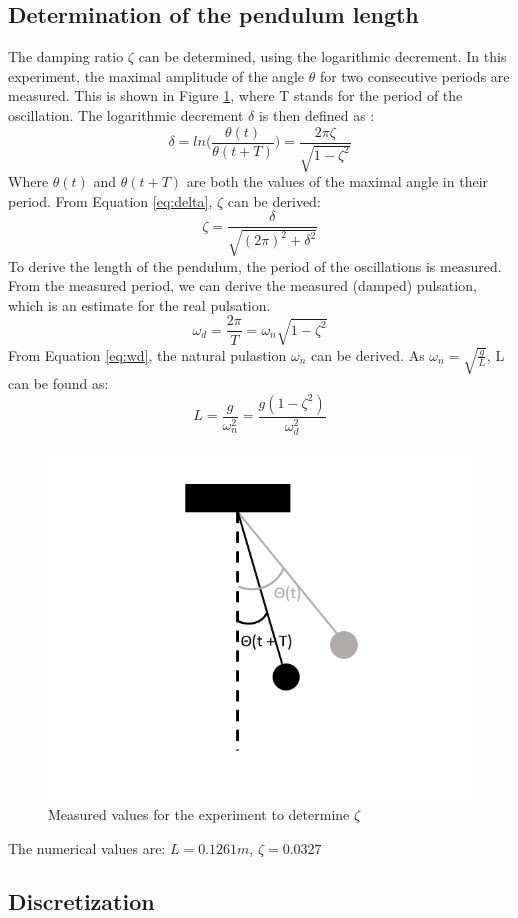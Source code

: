 \documentclass[a4paper,kul]{kulakarticle} %
\begin{document}
\subsection{Determination of the pendulum length}
The damping ratio $\zeta$ can be determined, using the logarithmic decrement. In this experiment, the maximal amplitude of the angle $\theta$ for two consecutive periods are measured. This is shown in Figure \ref{fig:logdecrement}, where T stands for the period of the oscillation. The logarithmic decrement $\delta$ is then defined as \cite{slidestrillingen}:
\begin{equation}
	\delta = ln\bigg(\frac{\theta(t)}{\theta(t+T)}\bigg) = \frac{2\pi\zeta}{\sqrt{1-\zeta^2}}
	\label{eq:delta}
\end{equation}
Where $\theta(t)$ and $\theta(t+T)$ are both the values of the maximal angle in their period. From Equation \ref{eq:delta}, $\zeta$ can be derived:
\begin{equation}
	\zeta = \frac{\delta}{\sqrt{(2\pi)^2+\delta^2}}
\end{equation}
To derive the length of the pendulum, the period of the oscillations is measured. From the measured period, we can derive the measured (damped) pulsation, which is an estimate for the real pulsation. 
\begin{equation}
	\omega_d = \frac{2\pi}{T} = \omega_n\sqrt{1-\zeta^2}
	\label{eq:wd}
\end{equation}
From Equation \ref{eq:wd}, the natural pulastion $\omega_n$ can be derived. As $\omega_n = \sqrt{\frac{g}{L}}$, L can be found as:
\begin{equation}
	L = \frac{g}{\omega_n^2} = \frac{g(1-\zeta^2)}{\omega_d^2}
\end{equation}


\begin{figure}[htp!]
	\centering
	\includegraphics[width=0.6\linewidth]{logdecrement.png}
	\caption{Measured values for the experiment to determine $\zeta$}
	\label{fig:logdecrement}
\end{figure}
The numerical values are: $L = 0.1261m$, $\zeta = 0.0327$

\subsection{Discretization}




\end{document}

